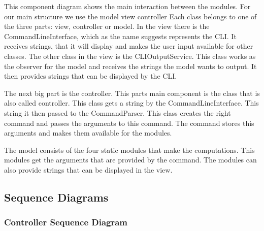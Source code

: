 \documentclass[parskip=full]{scrartcl}
\begin{document}
This component diagram shows the main interaction between the modules.
For our main structure we use the model view controller
Each class belongs to one of the three parts: view, controller or model.
In the view there is the CommandLineInterface, which as the name suggests represents the \gls{CLI}.
It receives strings, that it will display and makes the user input available for other classes.
The other class in the view is the CLIOutputService.
This class works as the observer for the model and receives the strings the model wants to output.
It then provides strings that can be displayed by the \gls{CLI}.

The next big part is the controller.
This parts main component is the class that is also called controller.
This class gets a string by the CommandLineInterface.
This string it then passed to the CommandParser.
This class creates the right command and passes the arguments to this command.
The command stores this arguments and makes them available for the modules.

The model consists of the four static modules that make the computations.
This modules get the arguments that are provided by the command.
The modules can also provide strings that can be displayed in the view.

\newpage

\subsection{Sequence Diagrams}

\subsubsection{Controller Sequence Diagram}

\begin{figure}[h]
\begin{center}

\label{Controller Sequence Diagram}
\end{center}
\end{figure}
\newpage
\end{document}
